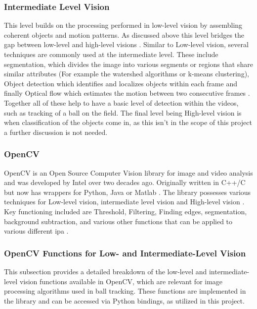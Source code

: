 \documentclass[12pt,a4paper]{article}
\begin{document}
\subsubsection{Intermediate Level Vision}
This level builds on the processing performed in low-level vision by assembling coherent objects and motion patterns. As discussed above this level bridges the gap between low-level and high-level visions \parencite{metaeye}. Similar to Low-level vision, several techniques are commonly used at the intermediate level. These include segmentation, which divides the image into various segments or regions that share similar attributes (For example the watershed algorithms or k-means clustering), Object detection which identifies and localizes objects within each frame and finally Optical flow which estimates the motion between two consecutive frames \parencite{metaeye}. Together all of these help to have a basic level of detection within the videos, such as tracking of a ball on the field. The final level being High-level vision is when classification of the objects come in, as this isn't in the scope of this project a further discussion is not needed.

\subsubsection{OpenCV}
OpenCV \parencite{opencv_library} is an Open Source Computer Vision library for image and video analysis and was developed by Intel over two decades ago. Originally written in C++/C but now has wrappers for Python, Java or Matlab \parencite{culjak2012opencv}. The library possesses various techniques for Low-level vision, intermediate level vision and High-level vision \parencite{mohamad2015opencv}. Key functioning included are Threshold, Filtering, Finding edges, segmentation, background subtraction, and various other functions that can be applied to various different \acs{ipa} \parencite{marengoni2011opencv}. 

\subsubsection{OpenCV Functions for Low- and Intermediate-Level Vision}
This subsection provides a detailed breakdown of the low-level and intermediate-level vision functions available in OpenCV, which are relevant for image processing algorithms used in ball tracking. These functions are implemented in the library and can be accessed via Python bindings, as utilized in this project.
\end{document}
